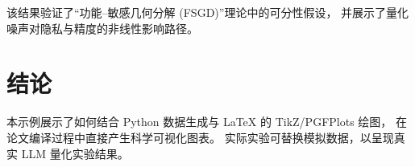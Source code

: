 \documentclass[letterpaper,twocolumn,10pt]{article}
\begin{document}
该结果验证了“功能–敏感几何分解 (FSGD)”理论中的可分性假设，
并展示了量化噪声对隐私与精度的非线性影响路径。



\section{结论}
本示例展示了如何结合 Python 数据生成与 LaTeX 的 TikZ/PGFPlots 绘图，
在论文编译过程中直接产生科学可视化图表。
实际实验可替换模拟数据，以呈现真实 LLM 量化实验结果。

\end{document}

